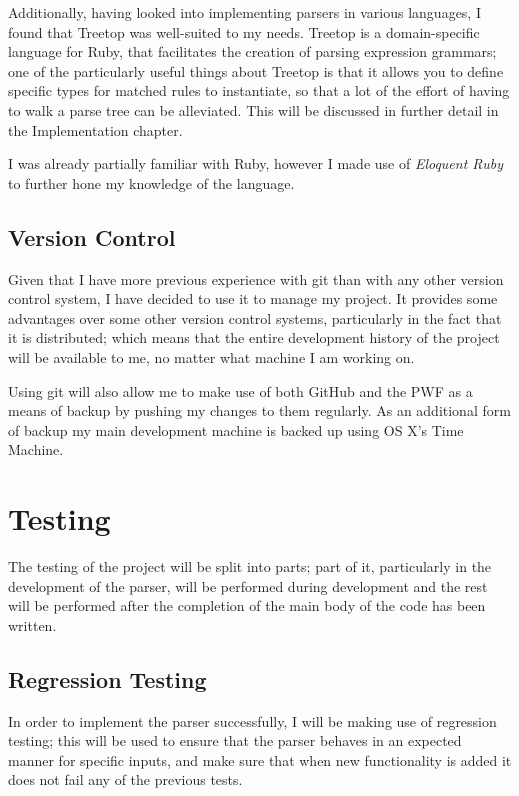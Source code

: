     Additionally, having looked into implementing parsers in various languages,
    I found that Treetop\cite{website:treetop} was well-suited to my needs.
    Treetop is a domain-specific language for Ruby, that facilitates the
    creation of parsing expression grammars; one of the particularly useful
    things about Treetop is that it allows you to define specific types for
    matched rules to instantiate, so that a lot of the effort of having to walk
    a parse tree can be alleviated. This will be discussed in further detail in
    the Implementation chapter.

    I was already partially familiar with Ruby, however I made use of
    \emph{Eloquent Ruby}\cite{book:eloquent_ruby} to further hone my knowledge
    of the language.
  \subsection{Version Control}
    Given that I have more previous experience with git than with any other
    version control system, I have decided to use it to manage my project. It
    provides some advantages over some other version control systems,
    particularly in the fact that it is distributed; which means that the entire
    development history of the project will be available to me, no matter what
    machine I am working on.

    Using git will also allow me to make use of both GitHub and the PWF as a
    means of backup by pushing my changes to them regularly. As an additional
    form of backup my main development machine is backed up using OS X's Time
    Machine.

\section{Testing}
The testing of the project will be split into parts; part of it, particularly
in the development of the parser, will be performed during development and the
rest will be performed after the completion of the main body of the code has
been written.

  \subsection{Regression Testing}
    In order to implement the parser successfully, I will be making use of
    regression testing; this will be used to ensure that the parser behaves
    in an expected manner for specific inputs, and make sure that when new
    functionality is added it does not fail any of the previous tests.


